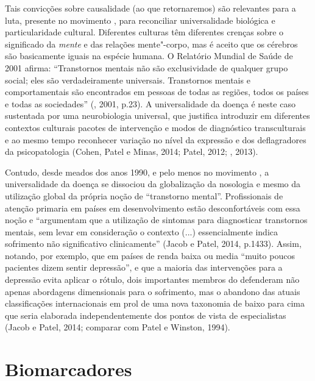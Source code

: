 Tais convicções sobre causalidade (ao que retornaremos) são relevantes
para a luta, presente no movimento , para reconciliar universalidade
biológica e particularidade cultural. Diferentes culturas têm diferentes
crenças sobre o significado da \emph{mente} e das relações mente"-corpo,
mas é aceito que os cérebros são basicamente iguais na espécie humana. O
Relatório Mundial de Saúde de 2001 afirma: ``Transtornos mentais não são
exclusividade de qualquer grupo social; eles são verdadeiramente
universais. Transtornos mentais e comportamentais são encontrados em
pessoas de todas as regiões, todos os países e todas as sociedades''
(, 2001, p.23). A universalidade da doença é neste caso sustentada
por uma neurobiologia universal, que justifica introduzir em diferentes
contextos culturais pacotes de intervenção e modos de diagnóstico
transculturais e ao mesmo tempo reconhecer variação no nível da
expressão e dos deflagradores da psicopatologia (Cohen, Patel e Minas,
2014; Patel, 2012; , 2013).

Contudo, desde meados dos anos 1990, e pelo menos no movimento , a
universalidade da doença se dissociou da globalização da nosologia e
mesmo da utilização global da própria noção de ``transtorno mental''.
Profissionais de atenção primaria em países em desenvolvimento estão
desconfortáveis com essa noção e ``argumentam que a utilização de
sintomas para diagnosticar transtornos mentais, sem levar em
consideração o contexto (...) essencialmente indica sofrimento não
significativo clinicamente'' (Jacob e Patel, 2014, p.1433). Assim,
notando, por exemplo, que em países de renda baixa ou media ``muito
poucos pacientes dizem sentir depressão'', e que a maioria das
intervenções para a depressão evita aplicar o rótulo, dois importantes
membros do  defenderam não apenas abordagens dimensionais para o
sofrimento, mas o abandono das atuais classificações internacionais em
prol de uma nova taxonomia de baixo para cima que seria elaborada
independentemente dos pontos de vista de especialistas (Jacob e Patel,
2014; comparar com Patel e Winston, 1994).

\chapter{Biomarcadores}

